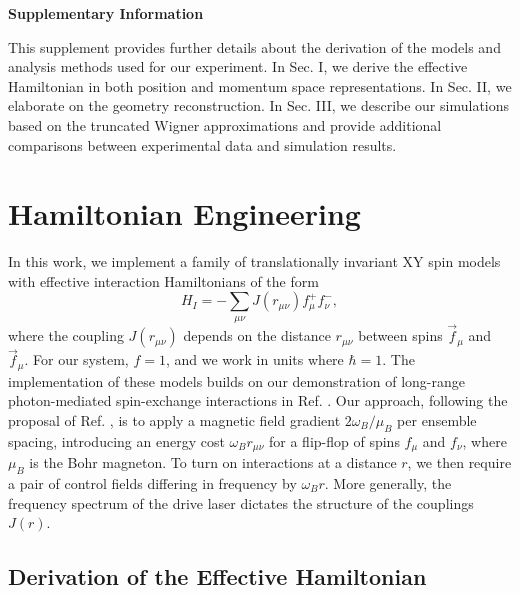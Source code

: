 
\onecolumngrid
\begin{bibunit}
\begin{center}
 {\Large\textbf{Supplementary Information}}
\end{center}
\vspace*{.5cm}
\renewcommand{\figurename}{\textbf{Fig.}}
\renewcommand{\theequation}{S\arabic{equation}}
\renewcommand{\thefigure}{S\arabic{figure}}
\setcounter{equation}{0}
\setcounter{figure}{0}
\setcounter{section}{0}
This supplement provides further details about the derivation of the models and analysis methods used for our experiment.
In Sec. I, we derive the effective Hamiltonian in both position and momentum space representations. In Sec. II, we elaborate on the geometry reconstruction. In Sec. III, we describe our simulations based on the truncated Wigner approximations and provide additional comparisons between experimental data and simulation results.

\section{Hamiltonian Engineering}

In this work, we implement a family of translationally invariant XY spin models with effective interaction Hamiltonians of the form
\begin{equation}
H_I = -\sum_{\mu\nu} J(r_{\mu \nu}) f^+_\mu f^-_\nu,
\end{equation}
where the coupling $J(r_{\mu \nu})$ depends on the distance $r_{\mu \nu}$ between spins $\vec{f}_\mu$  and $\vec{f}_\mu$. For our system, $f=1$, and we work in units where $\hbar = 1$. The implementation of these models builds on our demonstration of long-range photon-mediated spin-exchange interactions in Ref. \cite{davis2019photon}.  Our approach, following the proposal of Ref. \cite{hung2016quantum}, is to apply a magnetic field gradient $2\omega_B/\mu_B$ per ensemble spacing,  introducing an energy cost $\omega_B r_{\mu\nu}$ for a flip-flop of spins $f_\mu$ and $f_\nu$, where $\mu_B$ is the Bohr magneton.  To turn on interactions at a distance $r$, we then require a pair of control fields differing in frequency by $\omega_B r$.  More generally, the frequency spectrum of the drive laser dictates the structure of the couplings $J(r)$.

\subsection{Derivation of the Effective Hamiltonian}


\end{bibunit}
